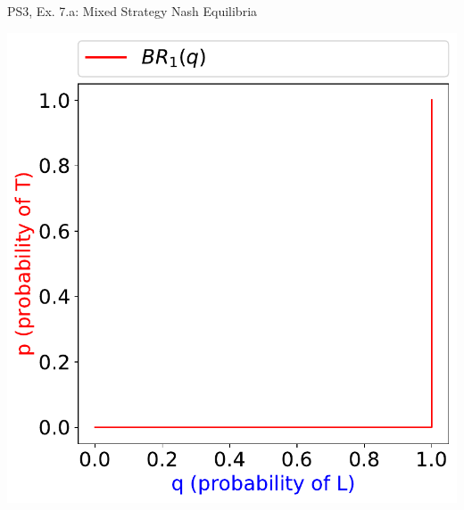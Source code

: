 \begin{frame}{PS3, Ex. 7.a: Mixed Strategy Nash Equilibria}
\begin{multicols}{2}
    \includegraphics[width=\columnwidth]{figures/5a1}
  \vfill\null
  \end{multicols}
\end{frame}
